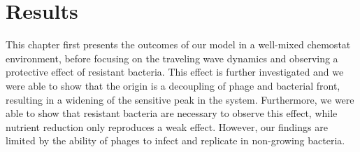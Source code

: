 \chapter{Results}
\label{chap:phages_results}

This chapter first presents the outcomes of our model in a well-mixed chemostat environment, before focusing on the traveling wave dynamics and observing a protective effect of resistant bacteria. This effect is further investigated and we were able to show that the origin is a decoupling of phage and bacterial front, resulting in a widening of the sensitive peak in the system. Furthermore, we were able to show that resistant bacteria are necessary to observe this effect, while nutrient reduction only reproduces a weak effect. However, our findings are limited by the ability of phages to infect and replicate in non-growing bacteria.

